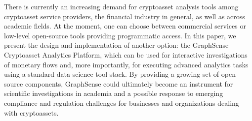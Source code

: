 
There is currently an increasing demand for cryptoasset analysis tools among cryptoasset service providers, the financial industry in general, as well as across academic fields.
At the moment, one can choose between commercial services or low-level open-source tools providing programmatic access.
In this paper, we present the design and implementation of another option: the GraphSense Cryptoasset Analytics Platform, which can be used for interactive investigations of monetary flows and, more importantly, for executing advanced analytics tasks using a standard data science tool stack.
By providing a growing set of open-source components, GraphSense could ultimately become an instrument for scientific investigations in academia and a possible response to emerging compliance and regulation challenges for businesses and organizations dealing with cryptoassets.